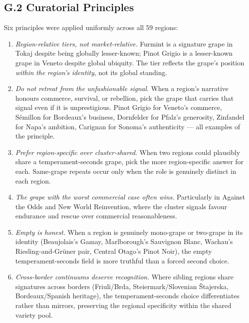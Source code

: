 \documentclass[11pt]{article}
\begin{document}
\subsection*{G.2 Curatorial Principles}

Six principles were applied uniformly across all 59 regions:

\begin{enumerate}[leftmargin=2em,itemsep=0.1em]
\item \emph{Region-relative tiers, not market-relative.} Furmint is a signature grape in Tokaj despite being globally lesser-known; Pinot Grigio is a lesser-known grape in Veneto despite global ubiquity. The tier reflects the grape's position \emph{within the region's identity}, not its global standing.

\item \emph{Do not retreat from the unfashionable signal.} When a region's narrative honours commerce, survival, or rebellion, pick the grape that carries that signal even if it is unprestigious. Pinot Grigio for Veneto's commerce, S\'emillon for Bordeaux's business, Dornfelder for Pfalz's generosity, Zinfandel for Napa's ambition, Carignan for Sonoma's authenticity --- all examples of the principle.

\item \emph{Prefer region-specific over cluster-shared.} When two regions could plausibly share a temperament-seconds grape, pick the more region-specific answer for each. Same-grape repeats occur only when the role is genuinely distinct in each region.

\item \emph{The grape with the worst commercial case often wins.} Particularly in Against the Odds and New World Reinvention, where the cluster signals favour endurance and rescue over commercial reasonableness.

\item \emph{Empty is honest.} When a region is genuinely mono-grape or two-grape in its identity (Beaujolais's Gamay, Marlborough's Sauvignon Blanc, Wachau's Riesling-and-Gr\"uner pair, Central Otago's Pinot Noir), the empty temperament-seconds field is more truthful than a forced second choice.

\item \emph{Cross-border continuums deserve recognition.} Where sibling regions share signatures across borders (Friuli/Brda, Steiermark/Slovenian \v{S}tajerska, Bordeaux/Spanish heritage), the temperament-seconds choice differentiates rather than mirrors, preserving the regional specificity within the shared variety pool.
\end{enumerate}
\end{document}
